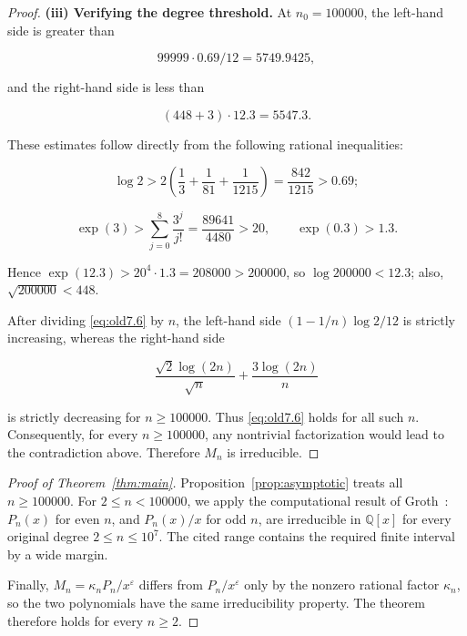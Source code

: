 \documentclass[11pt,a4paper]{article}
\numberwithin{equation}{section}
\theoremstyle{definition}
\begin{document}
\begin{proof}
\textbf{(iii) Verifying the degree threshold.}
At \(n_0=100000\), the left-hand side is greater than

\[
99999\cdot0.69/12=5749.9425,
\]

and the right-hand side is less than

\[
(448+3)\cdot12.3=5547.3.
\]

These estimates follow directly from the following rational inequalities:

\[
\log2>2\left(\frac13+\frac1{81}+\frac1{1215}\right)
=\frac{842}{1215}>0.69;
\]

\[
\exp(3)>\sum_{j=0}^8\frac{3^j}{j!}
=\frac{89641}{4480}>20,\qquad \exp(0.3)>1.3.
\]

Hence \(\exp(12.3)>20^4\cdot1.3=208000>200000\), so \(\log200000<12.3\); also, \(\sqrt{200000}<448\).

After dividing \eqref{eq:old7.6} by \(n\), the left-hand side \((1-1/n)\log2/12\) is strictly increasing, whereas the right-hand side

\[
\frac{\sqrt2\log(2n)}{\sqrt n}+\frac{3\log(2n)}n
\]

is strictly decreasing for \(n\ge100000\). Thus \eqref{eq:old7.6} holds for all such \(n\).
Consequently, for every \(n\ge100000\), any nontrivial factorization would lead to the contradiction above. Therefore \(M_n\) is irreducible.
\end{proof}

\begin{proof}[Proof of Theorem~\ref{thm:main}]
Proposition~\ref{prop:asymptotic} treats all \(n\ge100000\). For \(2\le n<100000\), we apply the computational result of Groth~\cite{groth}: \(P_n(x)\) for even \(n\), and \(P_n(x)/x\) for odd \(n\), are irreducible in \(\mathbb Q[x]\) for every original degree \(2\le n\le10^7\). The cited range contains the required finite interval by a wide margin.

Finally, \(M_n=\kappa_nP_n/x^\varepsilon\) differs from \(P_n/x^\varepsilon\) only by the nonzero rational factor \(\kappa_n\), so the two polynomials have the same irreducibility property. The theorem therefore holds for every \(n\ge2\).
\end{proof}
\end{document}

